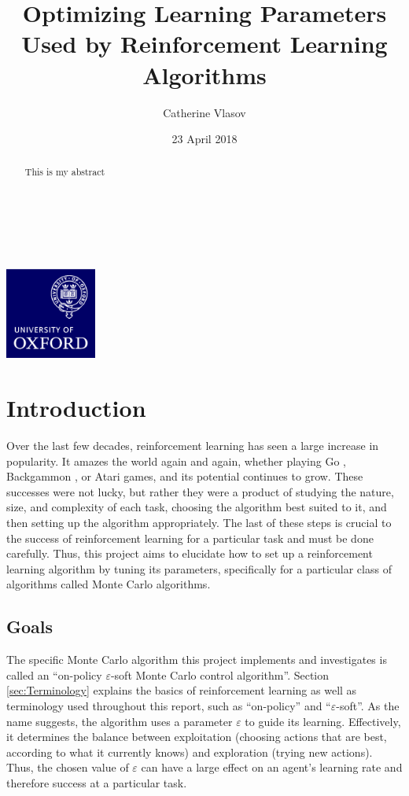 \documentclass[11pt,a4paper]{report}
\author{Catherine Vlasov}
\title{Optimizing Learning Parameters Used by Reinforcement Learning Algorithms}
\date{23 April 2018}
\begin{document}
\makeatletter
	\begin{titlepage}
		\vspace*{\fill}
		\begin{center}
			{\huge \bfseries \@title }
			\\[4ex]
			{\LARGE  \@author}
			\\[2ex]
			{\large \@date}
			\\[50ex]
			\includegraphics[width=30mm]{oxlogo.png}
		\end{center}
		\vspace*{\fill}
	\end{titlepage}
\makeatother


\begin{abstract}
This is my abstract
\end{abstract}


\tableofcontents


\chapter{Introduction}

Over the last few decades, reinforcement learning has seen a large increase in popularity. It amazes the world again and again, whether playing Go \cite{go}, Backgammon \cite{backgammon}, or Atari \cite{atari} games, and its potential continues to grow. These successes were not lucky, but rather they were a product of studying the nature, size, and complexity of each task, choosing the algorithm best suited to it, and then setting up the algorithm appropriately. The last of these steps is crucial to the success of reinforcement learning for a particular task and must be done carefully. Thus, this project aims to elucidate how to set up a reinforcement learning algorithm by tuning its parameters, specifically for a particular class of algorithms called Monte Carlo algorithms.


\section{Goals}

The specific Monte Carlo algorithm this project implements and investigates is called an ``on-policy $\varepsilon$-soft Monte Carlo control algorithm''. Section \ref{sec:Terminology} explains the basics of reinforcement learning as well as terminology used throughout this report, such as ``on-policy'' and ``$\varepsilon$-soft''. As the name suggests, the algorithm uses a parameter $\varepsilon$ to guide its learning. Effectively, it determines the balance between exploitation (choosing actions that are best, according to what it currently knows) and exploration (trying new actions). Thus, the chosen value of $\varepsilon$ can have a large effect on an agent's learning rate and therefore success at a particular task.
\end{document}
